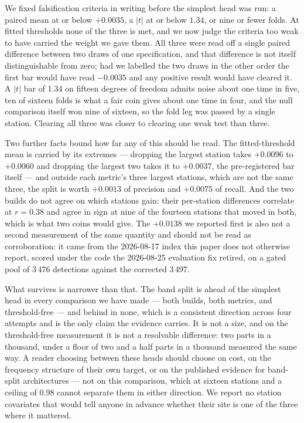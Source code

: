 \documentclass[review,3p,times]{elsarticle}
\begin{document}
We fixed falsification criteria in writing before the simplest head was run: a
paired mean at or below $+0.0035$, a $|t|$ at or below $1.34$, or nine or fewer
folds. At fitted thresholds none of the three is met, and we now judge the
criteria too weak to have carried the weight we gave them. All three were read
off a single paired difference between two draws of one specification, and that
difference is not itself distinguishable from zero; had we labelled the two
draws in the other order the first bar would have read $-0.0035$ and any
positive result would have cleared it. A $|t|$ bar of 1.34 on fifteen degrees of
freedom admits noise about one time in five, ten of sixteen folds is what a fair
coin gives about one time in four, and the null comparison itself won nine of
sixteen, so the fold leg was passed by a single station. Clearing all three was
closer to clearing one weak test than three.

Two further facts bound how far any of this should be read. The fitted-threshold
mean is carried by its extremes --- dropping the largest station takes $+0.0096$
to $+0.0060$ and dropping the largest two takes it to $+0.0037$, the
pre-registered bar itself --- and outside each metric's three largest stations,
which are not the same three, the split is worth $+0.0013$ of precision and
$+0.0075$ of recall. And the two builds do not agree on which stations gain:
their per-station differences correlate at $r = 0.38$ and agree in sign at nine
of the fourteen stations that moved in both, which is what two coins would give.
The $+0.0138$ we reported first is also not a second measurement of the same
quantity and should not be read as corroboration: it came from the 2026-08-17
index this paper does not otherwise report, scored under the code the 2026-08-25
evaluation fix retired, on a gated pool of 3\,476 detections against the
corrected 3\,497.

What survives is narrower than that. The band split is ahead of the simplest
head in every comparison we have made --- both builds, both metrics, and
threshold-free --- and behind in none, which is a consistent direction across
four attempts and is the only claim the evidence carries. It is not a size, and
on the threshold-free measurement it is not a resolvable difference: two parts
in a thousand, under a floor of two and a half parts in a thousand measured the
same way. A reader choosing between these heads should choose on cost, on the
frequency structure of their own target, or on the published evidence for
band-split architectures --- not on this comparison, which at sixteen stations
and a ceiling of 0.98 cannot separate them in either direction. We report no
station covariates that would tell anyone in advance whether their site is one
of the three where it mattered.
\end{document}
